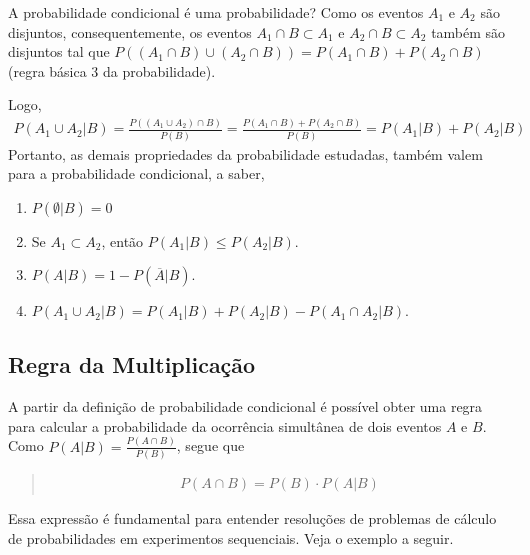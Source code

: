 \begin{example} {A probabilidade condicional é uma probabilidade?}
Como os eventos \(A_1\) e \(A_2\) são disjuntos, consequentemente, os eventos \(A_1\cap B\subset A_1\) e \(A_2\cap B\subset A_2\)  também são disjuntos tal que \(P((A_1\cap B)\cup(A_2\cap B))=P(A_1\cap B)+P(A_2\cap B)\) (regra básica 3 da probabilidade).

Logo,
\begin{equation*}
\begin{split}P(A_1\cup A_2|B)=\frac{P((A_1\cup A_2)\cap B)}{P(B)}=\frac{P(A_1\cap B)+P(A_2\cap B)}{P(B)}=P(A_1|B)+P(A_2|B)\end{split}
\end{equation*}
Portanto, as demais propriedades da probabilidade estudadas, também valem para a probabilidade condicional, a saber,
\begin{enumerate}
\item {} 
\(P(\emptyset |B)=0\)

\item {} 
Se \(A_1\subset A_2\),  então \(P(A_1|B)\leq P(A_2|B)\).

\item {} 
\(P(A|B)=1-P(\overline{A}|B)\).

\item {} 
\(P(A_1 \cup A_2|B)=P(A_1|B)+P(A_2|B)-P(A_1\cap A_2|B)\).

\end{enumerate}
\end{example}


\subsection{Regra da Multiplicação}

A partir da definição de probabilidade condicional é possível obter uma regra para calcular a probabilidade da ocorrência simultânea de dois eventos \(A\)  e \(B\). Como \(\displaystyle{P(A|B)=\frac{P(A\cap B)}{P(B)}}\), segue que
\begin{quote}
\begin{equation*}
\begin{split}P(A\cap B)=P(B)\cdot P(A|B)\end{split}
\end{equation*}\end{quote}

Essa expressão é fundamental para entender resoluções de problemas de cálculo de probabilidades em experimentos sequenciais. Veja o exemplo a seguir.

